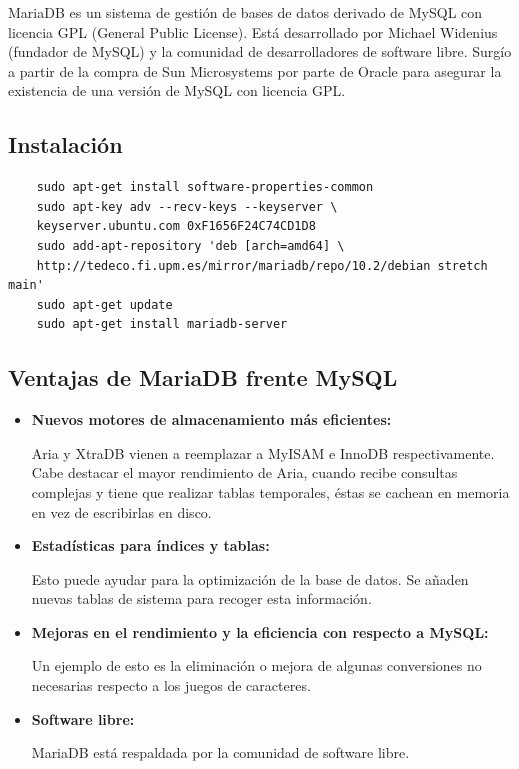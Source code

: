 \documentclass[openright,twoside,10pt]{book}
\begin{document}
    MariaDB es un sistema de gestión de bases de datos derivado de MySQL con
    licencia GPL (General Public License). Está desarrollado por Michael
    Widenius (fundador de MySQL) y la comunidad de desarrolladores de
    software libre. Surgío a partir de la compra de Sun Microsystems por
    parte de Oracle para asegurar la existencia de una versión de MySQL con
    licencia GPL.
    
    \subsection{Instalación}\label{instalaciuxf3n-4}
    
    \begin{verbatim}
    sudo apt-get install software-properties-common
    sudo apt-key adv --recv-keys --keyserver \
    keyserver.ubuntu.com 0xF1656F24C74CD1D8
    sudo add-apt-repository 'deb [arch=amd64] \
    http://tedeco.fi.upm.es/mirror/mariadb/repo/10.2/debian stretch main'
    sudo apt-get update
    sudo apt-get install mariadb-server
    \end{verbatim}
    
    \subsection{\texorpdfstring{Ventajas de MariaDB frente MySQL
    \cite{zeokat_mariadb, andergonzalez_mariadb, alidavergara_mariadb}}{Ventajas de MariaDB frente MySQL }}\label{ventajas-de-mariadb-frente-mysql}
    
    \begin{itemize}
    \item
      \textbf{Nuevos motores de almacenamiento más eficientes:}
    
      Aria y XtraDB vienen a reemplazar a MyISAM e InnoDB respectivamente.
      Cabe destacar el mayor rendimiento de Aria, cuando recibe consultas
      complejas y tiene que realizar tablas temporales, éstas se cachean en
      memoria en vez de escribirlas en disco.
    \item
      \textbf{Estadísticas para índices y tablas:}
    
      Esto puede ayudar para la optimización de la base de datos. Se añaden
      nuevas tablas de sistema para recoger esta información.
    \item
      \textbf{Mejoras en el rendimiento y la eficiencia con respecto a
      MySQL:}
    
      Un ejemplo de esto es la eliminación o mejora de algunas conversiones
      no necesarias respecto a los juegos de caracteres.
    \item
      \textbf{Software libre:}
    
      MariaDB está respaldada por la comunidad de software libre.
    \end{itemize}
    
\end{document}
